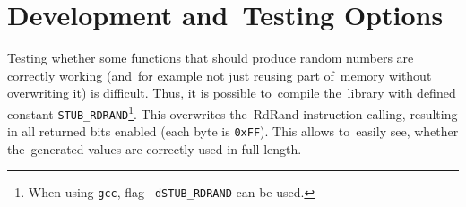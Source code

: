 \section{Development and~Testing Options}
\par{
Testing whether some functions that should produce random numbers are correctly working (and~for example not just reusing part of~memory without overwriting it) is difficult. Thus, it is possible to~compile the~library with defined constant {\tt STUB\_RDRAND}\footnote{When using {\tt gcc}, flag {\tt -dSTUB\_RDRAND} can be used.}. This overwrites the~RdRand instruction calling, resulting in all returned bits enabled (each byte is {\tt 0xFF}). This allows to~easily see, whether the~generated values are correctly used in full length.
}

